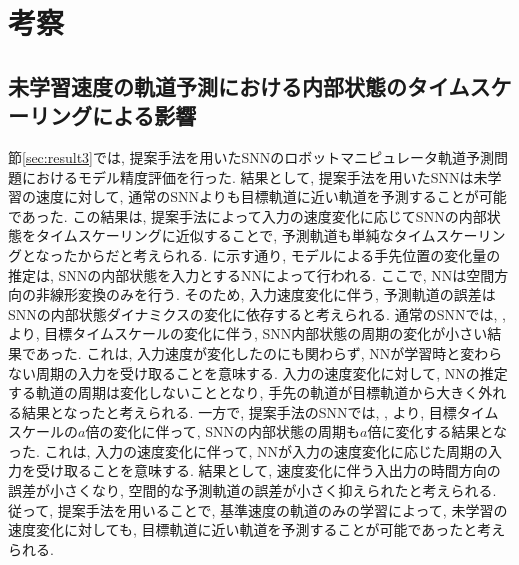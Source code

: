 \section{考察}
\subsection{未学習速度の軌道予測における内部状態のタイムスケーリングによる影響}
節\ref{sec:result3}では, 提案手法を用いたSNNのロボットマニピュレータ軌道予測問題におけるモデル精度評価を行った.
結果として, 提案手法を用いたSNNは未学習の速度に対して, 通常のSNNよりも目標軌道に近い軌道を予測することが可能であった.
この結果は, 提案手法によって入力の速度変化に応じてSNNの内部状態をタイムスケーリングに近似することで, 予測軌道も単純なタイムスケーリングとなったからだと考えられる.
に示す通り, モデルによる手先位置の変化量の推定は, SNNの内部状態を入力とするNNによって行われる.
ここで, NNは空間方向の非線形変換のみを行う.
そのため, 入力速度変化に伴う, 予測軌道の誤差はSNNの内部状態ダイナミクスの変化に依存すると考えられる.
通常のSNNでは, , より, 目標タイムスケールの変化に伴う, SNN内部状態の周期の変化が小さい結果であった.
これは, 入力速度が変化したのにも関わらず, NNが学習時と変わらない周期の入力を受け取ることを意味する.
入力の速度変化に対して, NNの推定する軌道の周期は変化しないこととなり, 手先の軌道が目標軌道から大きく外れる結果となったと考えられる.
一方で, 提案手法のSNNでは, , より, 目標タイムスケールの$a$倍の変化に伴って, SNNの内部状態の周期も$a$倍に変化する結果となった.
これは, 入力の速度変化に伴って, NNが入力の速度変化に応じた周期の入力を受け取ることを意味する.
結果として, 速度変化に伴う入出力の時間方向の誤差が小さくなり, 空間的な予測軌道の誤差が小さく抑えられたと考えられる.
従って, 提案手法を用いることで, 基準速度の軌道のみの学習によって, 未学習の速度変化に対しても, 目標軌道に近い軌道を予測することが可能であったと考えられる.

